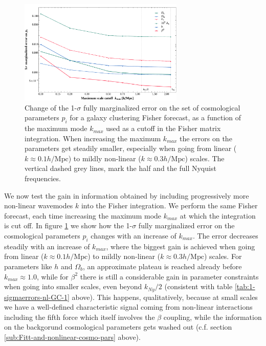 \begin{figure}[h]
\footnotesize
\centering{}
\includegraphics[width=0.7\textwidth]{Chapters/fitting-funcs/figures/kmaxvariationGC-sigmav}
\protect\protect
\caption[Effect of non-linear scales on the 1$\sigma$ errors on cosmological parameters.]{\label{fig:kmax-change-lin-nonlin} 
Change of the 1-$\sigma$ fully
marginalized error on the set of cosmological parameters $p_{i}$
for a galaxy clustering Fisher forecast, as a function of the maximum
mode $k_{max}$ used as a cutoff in the Fisher matrix integration.
When increasing the maximum $k_{max}$ the errors on the parameters
get steadily smaller, especially when going from linear ($k\approx0.1h/\mbox{Mpc}$)
to mildly non-linear ($k\approx0.3h/\mbox{Mpc}$) scales. The vertical
dashed grey lines, mark the half and the full Nyquist frequencies.}
\end{figure}
\normalsize

We now test the gain in information obtained by including progressively
more non-linear wavemodes $k$ into the Fisher integration. We perform
the same Fisher forecast, each time increasing the maximum mode $k_{max}$
at which the integration is cut off. In figure \ref{fig:kmax-change-lin-nonlin}
we show how the 1-$\sigma$ fully marginalized error on the cosmological
parameters $p_{i}$ changes with an increase of $k_{max}$. The error
decreases steadily with an increase of $k_{max}$, where the biggest
gain is achieved when going from linear ($k\approx0.1h/\mbox{Mpc}$)
to mildly non-linear ($k\approx0.3h/\mbox{Mpc}$) scales. For parameters
like $h$ and $\Omega_{b}$, an approximate plateau is reached already
before $k_{max}\approx1.0$, while for $\beta^{2}$ there is still
a considerable gain in parameter constraints when going into smaller
scales, even beyond $k_{Ny}/2$ (consistent with table \ref{tab:1-sigmaerrors-nl-GC-1}
above). This happens, qualitatively, because at small scales we have
a well-defined characteristic signal coming from non-linear interactions
including the fifth force which itself involves the $\beta$ coupling,
while the information on the backgorund cosmological parameters gets
washed out (c.f. section \ref{sub:Fitt-and-nonlinear-cosmo-pars}
above).

